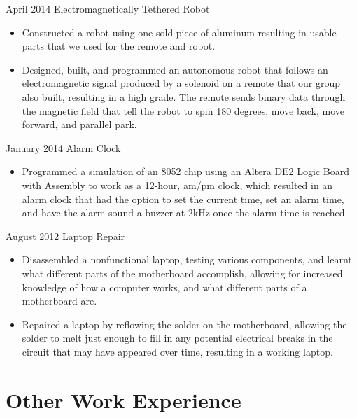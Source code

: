 \documentclass[]{friggeri-cv} %
\begin{document}
\begin{entrylist}

\entry
{April 2014}
{Electromagnetically Tethered Robot}
{}
{
\begin{itemize}
\item Constructed a robot using one sold piece of aluminum resulting in usable parts
that we used for the remote and
robot.
\item Designed, built, and programmed an autonomous robot that follows an
electromagnetic signal produced by a
solenoid on a remote that our group also built, resulting in a high grade. The
remote sends binary data through
the magnetic field that tell the robot to spin 180 degrees, move back, move
forward, and parallel park.
\end{itemize}
}
\entry
{January 2014}
{Alarm Clock}
{}
{
\begin{itemize}
\item Programmed a simulation of an 8052 chip using an Altera DE2 Logic Board with
Assembly to work as a 12-hour,
am/pm clock, which resulted in an alarm clock that had the option to set the
current time, set an alarm time, and
have the alarm sound a buzzer at 2kHz once the alarm time is reached.
\end{itemize}
}
\entry
{August 2012}
{Laptop Repair}
{}
{
\begin{itemize}
\item Disassembled a nonfunctional laptop, testing various components, and learnt what
different parts of the
motherboard accomplish, allowing for increased knowledge of how a computer
works, and what different parts of
a motherboard are.
\item Repaired a laptop by reflowing the solder on the motherboard, allowing the
solder to melt just enough to fill in
any potential electrical breaks in the circuit that may have appeared over time,
resulting in a working laptop.
\end{itemize}
}
\end{entrylist}

\newpage

\section{Other Work Experience}
\end{document}
